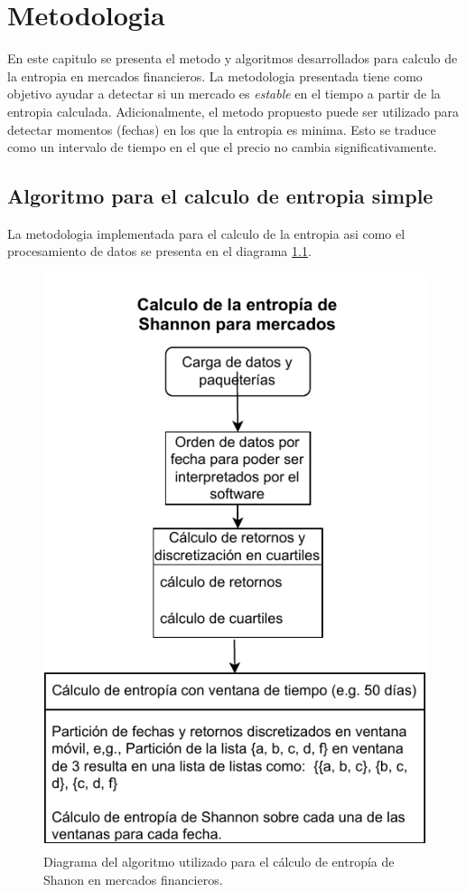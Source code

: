 %
\chapter{Metodologia}
\label{Metodologia}

En este capitulo se presenta el metodo y algoritmos desarrollados para calculo de la entropia en mercados financieros.
La metodologia presentada tiene como objetivo ayudar a detectar si un mercado es \textit{estable} en el tiempo a partir de la entropia calculada.
Adicionalmente, el metodo propuesto puede ser utilizado para detectar momentos (fechas) en los que la entropia es minima. 
Esto se traduce como un intervalo de tiempo en el que el precio no cambia significativamente.


\section{Algoritmo para el calculo de entropia simple}
\label{sec_algorithm}
La metodologia implementada para el calculo de la entropia asi como el procesamiento de datos se presenta en el diagrama \ref{diagramaentropia1}.


\begin{figure}[h]
	\centering
	\includegraphics[width=0.7\linewidth]{figures/diagrama_entropia1}
	\caption{Diagrama del algoritmo utilizado para el c\'alculo de entrop\'ia de Shanon en mercados financieros.}
	\label{diagramaentropia1}
\end{figure}

